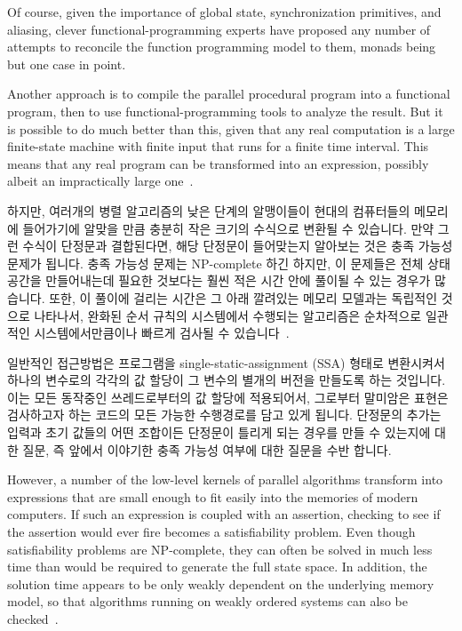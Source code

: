 Of course, given the importance of global state, synchronization
primitives, and aliasing, clever functional-programming experts have
proposed any number of attempts to reconcile the function programming
model to them, monads being but one case in point.

Another approach is to compile the parallel procedural program into
a functional program, then to use functional-programming tools to analyze
the result.
But it is possible to do much better than this, given that any real
computation is a large finite-state machine with finite input that
runs for a finite time interval.
This means that any real program can be transformed into an expression,
possibly albeit an impractically large one~\cite{VijayDSilva2012-sas}.
\fi

하지만, 여러개의 병렬 알고리즘의 낮은 단계의 알맹이들이 현대의 컴퓨터들의
메모리에 들어가기에 알맞을 만큼 충분히 작은 크기의 수식으로 변환될 수 있습니다.
만약 그런 수식이 단정문과 결합된다면, 해당 단정문이 들어맞는지 알아보는 것은
충족 가능성 문제가 됩니다.
충족 가능성 문제는 NP-complete 하긴 하지만, 이 문제들은 전체 상태 공간을
만들어내는데 필요한 것보다는 훨씬 적은 시간 안에 풀이될 수 있는 경우가
많습니다.
또한, 이 풀이에 걸리는 시간은 그 아래 깔려있는 메모리 모델과는 독립적인 것으로
나타나서, 완화된 순서 규칙의 시스템에서 수행되는 알고리즘은 순차적으로 일관적인
시스템에서만큼이나 빠르게 검사될 수 있습니다~\cite{JadeAlglave2013-cav}.

일반적인 접근방법은 프로그램을 single-static-assignment (SSA) 형태로 변환시켜서
하나의 변수로의 각각의 값 할당이 그 변수의 별개의 버전을 만들도록 하는
것입니다.
이는 모든 동작중인 쓰레드로부터의 값 할당에 적용되어서, 그로부터 말미암은
표현은 검사하고자 하는 코드의 모든 가능한 수행경로를 담고 있게 됩니다.
단정문의 추가는 입력과 초기 값들의 어떤 조합이든 단정문이 틀리게 되는 경우를
만들 수 있는지에 대한 질문, 즉 앞에서 이야기한 충족 가능성 여부에 대한 질문을
수반 합니다.
\iffalse

However, a number of the low-level kernels of parallel algorithms transform
into expressions that are small enough to fit easily into the memories
of modern computers.
If such an expression is coupled with an assertion, checking to see if
the assertion would ever fire becomes a satisfiability problem.
Even though satisfiability problems are NP-complete, they can often
be solved in much less time than would be required to generate the
full state space.
In addition, the solution time appears to be only weakly dependent on
the underlying memory model, so that algorithms running on weakly ordered
systems can also be checked~\cite{JadeAlglave2013-cav}.

